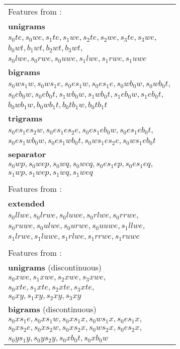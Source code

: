 \documentclass[11pt]{article}
\begin{document}
\begin{figure}
\begin{tabular}{>{\small}l}
{Features from \cite{zhang2009transition}:} \\
\textbf{unigrams} \\
$s_0te, s_0we, s_1te, s_1we, s_2te, s_2we, s_3te, s_3we,$ \\
$b_0wt, b_1wt, b_2wt, b_3wt,$ \\
$s_0lwe, s_0rwe, s_0uwe, s_1lwe, s_1rwe, s_1uwe$ \\
\textbf{bigrams} \\
$s_0ws_1w, s_0ws_1e, s_0es_1w, s_0es_1e, s_0wb_0w, s_0wb_0t,$ \\
$s_0eb_0w, s_0eb_0t, s_1wb_0w, s_1wb_0t, s_1eb_0w, s_1eb_0t,$ \\
$b_0wb_1w, b_0wb_1t, b_0tb_1w, b_0tb_1t$ \\
\textbf{trigrams} \\
$s_0es_1es_2w, s_0es_1es_2e, s_0es_1eb_0w, s_0es_1eb_0t,$ \\
$s_0es_1wb_0w, s_0es_1wb_0t, s_0ws_1es_2e, s_0ws_1eb_0t$ \\
\textbf{separator} \\
$s_0wp, s_0wep, s_0wq, s_0wcq, s_0es_1ep, s_0es_1eq,$ \\
$s_1wp, s_1wep, s_1wq, s_1weq$ \\
\\
{\footnotesize Features from \cite{zhu2013fast}:} \\
\textbf{extended} \\
$s_0llwe, s_0lrwe, s_0luwe, s_0rlwe, s_0rrwe,$ \\
$s_0ruwe, s_0ulwe, s_0urwe, s_0uuwe, s_1llwe,$ \\
$s_1lrwe, s_1luwe, s_1rlwe, s_1rrwe, s_1ruwe$ \\
\\
{\footnotesize Features from \cite{maier2015discontinuous}:} \\
\textbf{unigrams} (discontinuous) \\
$s_0xwe, s_1xwe, s_2xwe, s_3xwe,$ \\
$s_0xte, s_1xte, s_2xte, s_3xte,$ \\
$s_0xy, s_1xy, s_2xy, s_3xy$ \\
\textbf{bigrams} (discontinuous) \\
$s_0xs_1e, s_0xs_1w, s_0xs_1x, s_0ws_1x, s_0es_1x,$ \\
$s_0xs_2e, s_0xs_2w, s_0xs_2x, s_0ws_2x, s_0es_2x,$ \\
$s_0ys_1y, s_0ys_2y, s_0xb_0t, s_0xb_0w$ \\

\end{tabular}
\end{figure}
\end{document}
